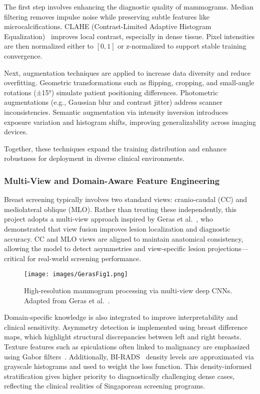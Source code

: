 \documentclass[12pt]{article}
\begin{document}
The first step involves enhancing the diagnostic quality of mammograms. Median filtering removes impulse noise while preserving subtle features like microcalcifications. CLAHE (Contrast-Limited Adaptive Histogram Equalization)~\cite{14} improves local contrast, especially in dense tissue. Pixel intensities are then normalized either to $[0,1]$ or z-normalized to support stable training convergence.

Next, augmentation techniques are applied to increase data diversity and reduce overfitting. Geometric transformations such as flipping, cropping, and small-angle rotations (±15°) simulate patient positioning differences. Photometric augmentations (e.g., Gaussian blur and contrast jitter) address scanner inconsistencies. Semantic augmentation via intensity inversion introduces exposure variation and histogram shifts, improving generalizability across imaging devices.

Together, these techniques expand the training distribution and enhance robustness for deployment in diverse clinical environments.

\subsubsection{Multi-View and Domain-Aware Feature Engineering}

Breast screening typically involves two standard views: cranio-caudal (CC) and mediolateral oblique (MLO). Rather than treating these independently, this project adopts a multi-view approach inspired by Geras et al.~\cite{8}, who demonstrated that view fusion improves lesion localization and diagnostic accuracy. CC and MLO views are aligned to maintain anatomical consistency, allowing the model to detect asymmetries and view-specific lesion projections—critical for real-world screening performance.

\begin{figure}[H]
\centering
\texttt{[image: images/GerasFig1.png]}
\caption{High-resolution mammogram processing via multi-view deep CNNs. Adapted from Geras et al.~\cite{8}.}
\label{fig:geras}
\end{figure}

Domain-specific knowledge is also integrated to improve interpretability and clinical sensitivity. Asymmetry detection is implemented using breast difference maps, which highlight structural discrepancies between left and right breasts. Texture features such as spiculations often linked to malignancy are emphasized using Gabor filters~\cite{20}. Additionally, BI-RADS~\cite{16} density levels are approximated via grayscale histograms and used to weight the loss function. This density-informed stratification gives higher priority to diagnostically challenging dense cases, reflecting the clinical realities of Singaporean screening programs.
\end{document}
